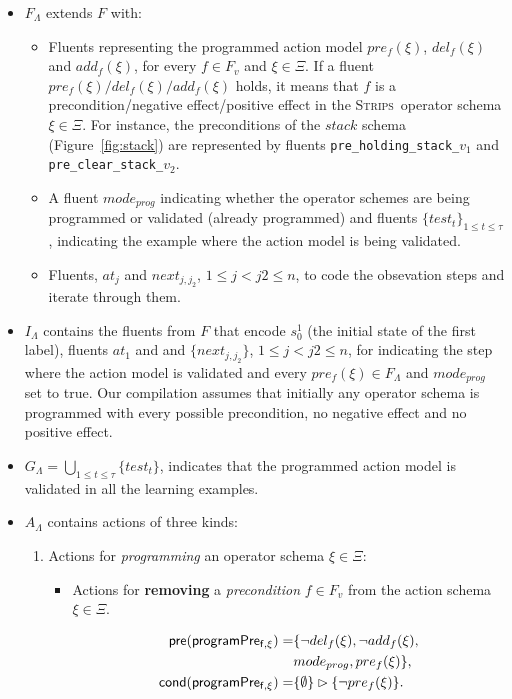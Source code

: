 \documentclass{article}
\newcommand{\pre}{\mathsf{pre}}     %
\newcommand{\cond}{\mathsf{cond}}   %
\newcommand{\strips}{\textsc{Strips}}     %
\begin{document}
\begin{itemize}
\item $F_{\Lambda}$ extends $F$ with:
\begin{itemize}
\item Fluents representing the programmed action model $pre_f(\xi)$, $del_f(\xi)$ and $add_f(\xi)$, for every $f\in F_v$ and $\xi \in \Xi$. If a fluent $pre_f(\xi)/del_f(\xi)/add_f(\xi)$ holds, it means that $f$ is a precondition/negative effect/positive effect in the \strips\ operator schema $\xi\in \Xi$. For instance, the preconditions of the $stack$ schema (Figure~\ref{fig:stack}) are represented by fluents {\small\tt pre\_holding\_stack\_$v_1$} and {\small\tt pre\_clear\_stack\_$v_2$}.
\item A fluent $mode_{prog}$ indicating whether the operator schemes are being programmed or validated (already programmed) and fluents $\{test_t\}_{1\leq t\leq \tau}$, indicating the example where the action model is being validated.
\item Fluents, $at_j$ and $next_{j,j_2}$, {\small $1\leq j<j2\leq n$}, to code the obsevation steps and iterate through them.
\end{itemize}
\item $I_{\Lambda}$ contains the fluents from $F$ that encode $s_0^1$ (the initial state of the first label), fluents $at_1$ and and $\{next_{j,j_2}\}$, {\small $1\leq j<j2\leq n$}, for indicating the step where the action model is validated and every $pre_f(\xi)\in F_{\Lambda}$ and $mode_{prog}$ set to true. Our compilation assumes that initially any operator schema is programmed with every possible precondition, no negative effect and no positive effect.
\item $G_{\Lambda}=\bigcup_{1\leq t\leq \tau}\{test_t\}$, indicates that the programmed action model is validated in all the learning examples.
\item $A_{\Lambda}$ contains actions of three kinds:
\begin{enumerate}
\item Actions for {\em programming} an operator schema $\xi\in\Xi$:
\begin{itemize}
\item Actions for {\bf removing} a {\em precondition} $f\in F_v$ from the action schema $\xi\in\Xi$.

\begin{small}
\begin{align*}
\hspace*{7pt}\pre(\mathsf{programPre_{f,\xi}})=&\{\neg del_{f}(\xi),\neg add_{f}(\xi),\\
& mode_{prog}, pre_{f}(\xi)\},\\
\cond(\mathsf{programPre_{f,\xi}})=&\{\emptyset\}\rhd\{\neg pre_{f}(\xi)\}.
\end{align*}
\end{small}


\end{itemize}
\end{enumerate}
\end{itemize}
\end{document}
